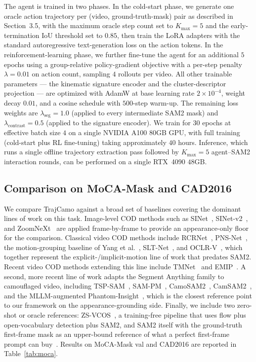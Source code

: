 \documentclass[11pt]{article}
\begin{document}
The agent is trained in two phases.
In the cold-start phase, we generate one oracle action trajectory per (video, ground-truth-mask) pair as described in Section~3.5, with the maximum oracle step count set to $K_{\max}=5$ and the early-termination IoU threshold set to $0.85$, then train the LoRA adapters with the standard autoregressive text-generation loss on the action tokens.
In the reinforcement-learning phase, we further fine-tune the agent for an additional $5$ epochs using a group-relative policy-gradient objective with a per-step penalty $\lambda=0.01$ on action count, sampling $4$ rollouts per video.
All other trainable parameters --- the kinematic signature encoder and the cluster-descriptor projection --- are optimized with AdamW at base learning rate $2\times10^{-4}$, weight decay $0.01$, and a cosine schedule with $500$-step warm-up.
The remaining loss weights are $\lambda_{\text{seg}}{=}1.0$ (applied to every intermediate SAM2 mask) and $\lambda_{\text{contrast}}{=}0.5$ (applied to the signature encoder).
We train for $30$ epochs at effective batch size $4$ on a single NVIDIA A100 $80$GB GPU, with full training (cold-start plus RL fine-tuning) taking approximately $40$ hours.
Inference, which runs a single offline trajectory extraction pass followed by $K_{\max}=5$ agent--SAM2 interaction rounds, can be performed on a single RTX~4090 $48$GB.

\subsection{Comparison on MoCA-Mask and CAD2016}

We compare TrajCamo against a broad set of baselines covering the dominant lines of work on this task.
Image-level COD methods such as SINet~\cite{cod10k}, SINet-v2~\cite{sinetv2}, and ZoomNeXt~\cite{zoomnext} are applied frame-by-frame to provide an appearance-only floor for the comparison.
Classical video COD methods include RCRNet~\cite{rcrnet}, PNS-Net~\cite{pnsnet}, the motion-grouping baseline of Yang et al.~\cite{yang2021}, SLT-Net~\cite{sltnet}, and OCLR-V~\cite{oclrv}, which together represent the explicit-/implicit-motion line of work that predates SAM2.
Recent video COD methods extending this line include TMNet~\cite{tmnet} and EMIP~\cite{emip}.
A second, more recent line of work adapts the Segment Anything family to camouflaged video, including TSP-SAM~\cite{tspsam}, SAM-PM~\cite{sampm}, CamoSAM2~\cite{camosam2}, CamSAM2~\cite{camsam2}, and the MLLM-augmented Phantom-Insight~\cite{phantominsight}, which is the closest reference point to our framework on the appearance-grounding side.
Finally, we include two zero-shot or oracle references: ZS-VCOS~\cite{zsvcos}, a training-free pipeline that uses flow plus open-vocabulary detection plus SAM2, and SAM2 itself with the ground-truth first-frame mask as an upper-bound reference of what a perfect first-frame prompt can buy~\cite{sam2}.
Results on MoCA-Mask val and CAD2016 are reported in Table~\ref{tab:moca}.
\end{document}
